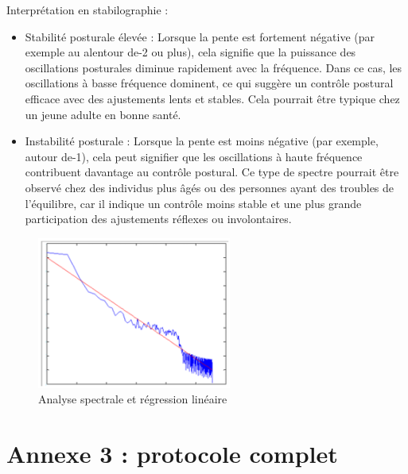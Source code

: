 Interprétation en stabilographie :

\begin{itemize}
    \item Stabilité posturale élevée : Lorsque la pente est fortement négative (par exemple au alentour de-2 ou plus), cela signifie que la puissance des oscillations posturales diminue rapidement avec la
    fréquence. Dans ce cas, les oscillations à basse fréquence dominent, ce qui suggère un contrôle
    postural efficace avec des ajustements lents et stables. Cela pourrait être typique chez un jeune
    adulte en bonne santé.

    \item Instabilité posturale : Lorsque la pente est moins négative (par exemple, autour de-1), cela peut
    signifier que les oscillations à haute fréquence contribuent davantage au contrôle postural. Ce type
    de spectre pourrait être observé chez des individus plus âgés ou des personnes ayant des troubles de
    l’équilibre, car il indique un contrôle moins stable et une plus grande participation des ajustements
    réflexes ou involontaires.
\end{itemize}


\begin{figure}[H]
    \centering
    \includegraphics[height=5cm]{images/methode/analyse_spec_regre_lin.png}
    \caption{Analyse spectrale et régression linéaire}\label{fig:regression_lineaire}
\end{figure}

\newpage
\section{Annexe 3 : protocole complet}

